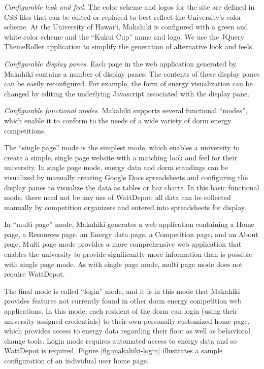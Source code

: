 {\em Configurable look and feel.} The color scheme and logos for the site
are defined in CSS files that can be edited or replaced to best reflect the
University's color scheme. At the University of Hawai`i, Makahiki is
configured with a green and white color scheme and the ``Kukui Cup'' name
and logo.   We use the JQuery ThemeRoller application to simplify the generation of 
alternative look and feels.

{\em Configurable display panes.} Each page in the web application generated by Makahiki
contains a number of display panes. The contents of these display panes can be easily 
reconfigured. For example, the form of energy visualization can be changed by editing 
the underlying Javascript associated with the display pane. 

{\em Configurable functional modes.}  Makahiki supports several functional ``modes'', which 
enable it to conform to the needs of a wide variety of dorm energy competitions.  

The ``single page'' mode is the simplest mode, which enables a university
to create a simple, single page website with a matching look and feel for
their university.  In single page mode, energy data and dorm standings can
be visualized by manually creating Google Docs spreadsheets and configuring
the display panes to visualize the data as tables or bar charts.  In this
basic functional mode, there need not be any use of WattDepot; all data can
be collected manually by competition organizers and entered into
spreadsheets for display.

In ``multi page'' mode, Makahiki generates a web application containing a
Home page, a Resources page, an Energy data page, a Competition page, and
an About page.  Multi page mode provides a more comprehensive web
application that enables the university to provide significantly more
information than is possible with single page mode.  As with single page
mode, multi page mode does not require WattDepot.

The final mode is called ``login'' mode, and it is in this mode that
Makahiki provides features not currently found in other dorm energy
competition web applications.  In this mode, each resident of the dorm can
login (using their university-assigned credentials) to their own personally
customized home page, which provides access to energy data regarding their
floor as well as behavioral change tools. Login mode requires automated access
to energy data and so WattDepot is required.  Figure \ref{fig:makahiki-login}
illustrates a sample configuration of an individual user home page.


